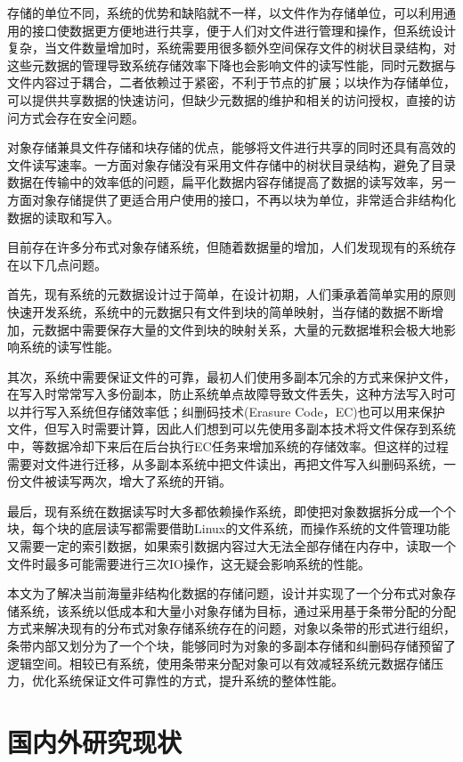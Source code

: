 存储的单位不同，系统的优势和缺陷就不一样，以文件作为存储单位，可以利用通用的接口使数据更方便地进行共享，便于人们对文件进行管理和操作，但系统设计复杂\cite{7}，当文件数量增加时，系统需要用很多额外空间保存文件的树状目录结构，对这些元数据的管理导致系统存储效率下降也会影响文件的读写性能，同时元数据与文件内容过于耦合，二者依赖过于紧密，不利于节点的扩展；以块作为存储单位，可以提供共享数据的快速访问，但缺少元数据的维护和相关的访问授权，直接的访问方式会存在安全问题\cite{8}。

对象存储兼具文件存储和块存储的优点，能够将文件进行共享的同时还具有高效的文件读写速率\cite{9}。一方面对象存储没有采用文件存储中的树状目录结构，避免了目录数据在传输中的效率低的问题，扁平化数据内容存储提高了数据的读写效率，另一方面对象存储提供了更适合用户使用的接口，不再以块为单位，非常适合非结构化数据的读取和写入。

目前存在许多分布式对象存储系统，但随着数据量的增加，人们发现现有的系统存在以下几点问题。

首先，现有系统的元数据设计过于简单，在设计初期，人们秉承着简单实用的原则快速开发系统，系统中的元数据只有文件到块的简单映射，当存储的数据不断增加，元数据中需要保存大量的文件到块的映射关系，大量的元数据堆积会极大地影响系统的读写性能。

其次，系统中需要保证文件的可靠，最初人们使用多副本冗余的方式来保护文件，在写入时常常写入多份副本，防止系统单点故障导致文件丢失，这种方法写入时可以并行写入系统但存储效率低；纠删码技术(Erasure Code，EC)也可以用来保护文件，但写入时需要计算，因此人们想到可以先使用多副本技术将文件保存到系统中，等数据冷却下来后在后台执行EC任务来增加系统的存储效率。但这样的过程需要对文件进行迁移，从多副本系统中把文件读出，再把文件写入纠删码系统，一份文件被读写两次，增大了系统的开销。

最后，现有系统在数据读写时大多都依赖操作系统，即使把对象数据拆分成一个个块，每个块的底层读写都需要借助Linux的文件系统，而操作系统的文件管理功能又需要一定的索引数据，如果索引数据内容过大无法全部存储在内存中，读取一个文件时最多可能需要进行三次IO操作，这无疑会影响系统的性能。

本文为了解决当前海量非结构化数据的存储问题，设计并实现了一个分布式对象存储系统，该系统以低成本和大量小对象存储为目标，通过采用基于条带分配的分配方式来解决现有的分布式对象存储系统存在的问题，对象以条带的形式进行组织，条带内部又划分为了一个个块，能够同时为对象的多副本存储和纠删码存储预留了逻辑空间。相较已有系统，使用条带来分配对象可以有效减轻系统元数据存储压力，优化系统保证文件可靠性的方式，提升系统的整体性能。

\section{国内外研究现状}%
